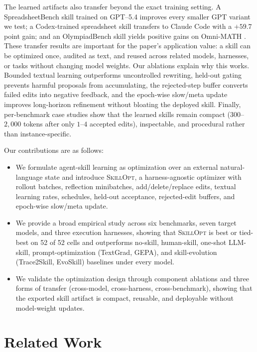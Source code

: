 \documentclass[
]{article}
\providecommand{\tightlist}{%
  \setlength{\itemsep}{0pt}\setlength{\parskip}{0pt}}
\newcommand{\ourmethod}{\textsc{SkillOpt}\xspace}
\begin{document}
The learned artifacts also transfer beyond the exact training setting. A
SpreadsheetBench skill trained on GPT--5.4 improves every smaller GPT
variant we test; a Codex-trained spreadsheet skill transfers to Claude
Code with a \(+59.7\) point gain; and an OlympiadBench skill yields
positive gains on Omni-MATH
\citep{gao2024omnimathuniversalolympiadlevel}. These transfer results
are important for the paper's application value: a skill can be
optimized once, audited as text, and reused across related models,
harnesses, or tasks without changing model weights. Our ablations
explain why this works. Bounded textual learning outperforms
uncontrolled rewriting, held-out gating prevents harmful proposals from
accumulating, the rejected-step buffer converts failed edits into
negative feedback, and the epoch-wise slow/meta update improves
long-horizon refinement without bloating the deployed skill. Finally,
per-benchmark case studies show that the learned skills remain compact
(\(300\)--\(2{,}000\) tokens after only \(1\)--\(4\) accepted edits),
inspectable, and procedural rather than instance-specific.

Our contributions are as follows:

\begin{itemize}
\tightlist
\item
  We formulate agent-skill learning as optimization over an external
  natural-language state and introduce \ourmethod{}, a harness-agnostic
  optimizer with rollout batches, reflection minibatches,
  add/delete/replace edits, textual learning rates, schedules, held-out
  acceptance, rejected-edit buffers, and epoch-wise slow/meta update.
\item
  We provide a broad empirical study across six benchmarks, seven target
  models, and three execution harnesses, showing that \ourmethod{} is
  best or tied-best on 52 of 52 cells and outperforms no-skill,
  human-skill, one-shot LLM-skill, prompt-optimization (TextGrad, GEPA),
  and skill-evolution (Trace2Skill, EvoSkill) baselines under every
  model.
\item
  We validate the optimization design through component ablations and
  three forms of transfer (cross-model, cross-harness, cross-benchmark),
  showing that the exported skill artifact is compact, reusable, and
  deployable without model-weight updates.
\end{itemize}

\section{Related Work}\label{sec-related-work}
\end{document}
